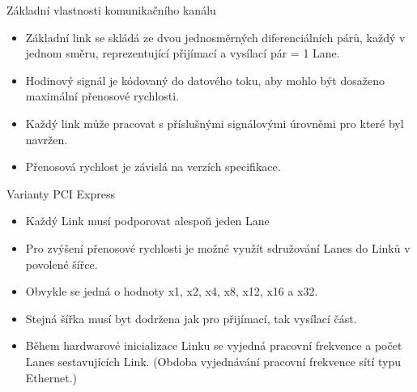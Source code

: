 \documentclass[aspectratio=43]{beamer}
\begin{document}
\begin{frame}{Základní vlastnosti komunikačního kanálu}
	\begin{itemize}
		\item Základní link se skládá ze dvou jednosměrných diferenciálních párů, každý v jednom směru, reprezentující přijímací a vysílací pár = 1 Lane.
		\item Hodinový signál je kódovaný do datového toku, aby mohlo být dosaženo maximální přenosové rychlosti.
		\item Každý link může pracovat s příslušnými signálovými úrovněmi pro které byl navržen.
		\item Přenosová rychlost je závislá na verzích specifikace.
	\end{itemize}
	
\end{frame}


\begin{frame}{Varianty PCI Express}
	\begin{itemize}
		\item Každý Link musí podporovat alespoň jeden Lane
		\item Pro zvýšení přenosové rychlosti je možné využít sdružování Lanes do Linků v povolené šířce.
		\item Obvykle se jedná o hodnoty x1, x2, x4, x8, x12, x16 a x32.
		\item Stejná šířka musí byt dodržena jak pro přijímací, tak vysílací část.
		\item Během hardwarové inicializace Linku se vyjedná pracovní frekvence a počet Lanes sestavujících Link. (Obdoba vyjednávání pracovní frekvence sítí typu Ethernet.)
	\end{itemize}
	
\end{frame}
\end{document}
